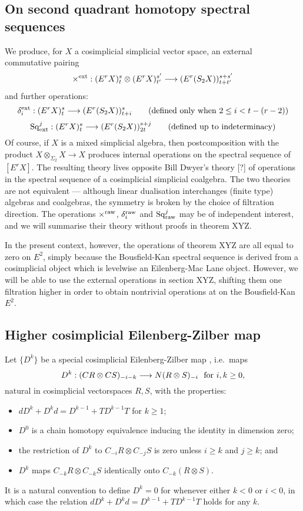\documentclass[11pt]{amsart}
\theoremstyle{plain}
\theoremstyle{definition}
\renewcommand{\to}{\longrightarrow}
\theoremstyle{plain}
\newcommand{\Sq}{\mathrm{Sq}}
\begin{document}
\begin{External spectral sequence operations}
\hfil

\subsection{On second quadrant homotopy spectral sequences}

We produce, for $X$ a cosimplicial simplicial vector space, an external commutative pairing
\[\times^\textup{ext}:(E^rX)^s_{t}\otimes (E^rX)_{t'}^{s'}\to (E^r(S_2X))^{s+s'}_{t+t'}\]
and further operations:
\[\delta_i^\textup{ext}:(E^rX)^s_{t}\to (E^r(S_2X))^{s}_{t+i}\textup{\qquad (defined only when $2\leq i<t-(r-2)$)}\]
\[\Sq^j_\textup{ext}:(E^rX)^s_{t}\to (E^r(S_2X))^{s+j}_{2t}\textup{\qquad (defined up to indeterminacy)}\]
Of course, if $X$ is a mixed simplicial algebra, then postcomposition with the product $X\otimes_{\Sigma_2}X\to X$ produces internal operations on the spectral sequence of $[E^rX]$. The resulting theory lives opposite Bill Dwyer's theory [?] of operations in the spectral sequence of a cosimplicial simplicial coalgebra. The two theories are not equivalent --- although linear dualisation interchanges (finite type) algebras and coalgebras, the symmetry is broken by the choice of filtration direction. The operations $\times^\textup{raw}$, $\delta_i^\textup{raw}$ and $\Sq^j_\textup{raw}$ may be of independent interest, and we will summarise their theory without proofs in theorem XYZ.

In the present context, however, the operations of theorem XYZ are all equal to zero on $E^2$, simply because the Bousfield-Kan spectral sequence is derived from a cosimplicial object which is levelwise an Eilenberg-Mac Lane object. However, we will be able to use the external operations in section XYZ, shifting them one filtration higher in order to obtain nontrivial operations at on the Bousfield-Kan $E^2$.

\subsection{Higher cosimplicial Eilenberg-Zilber map}
Let $\{D^k\}$ be a special cosimplicial Eilenberg-Zilber map \cite[5.2]{turner_opns_and_sseqs_I.pdf}, i.e.\  maps
\[D^k:(CR\otimes CS)_{-i-k}\to N(R\otimes S)_{-i}\textup{\ \ for $i,k\geq0$},\]
natural in cosimplicial vectorspaces $R,S$,
with the properties:
\begin{itemize}
\setlength{\parindent}{.25in}
\item $dD^k+D^kd=D^{k-1}+TD^{k-1}T$ for $k\geq1$;
\item $D^0$ is a chain homotopy equivalence inducing the identity in dimension zero;
\item the restriction of $D^k$ to $C_{-i}R\otimes C_{-j}S$ is zero unless $i\geq k$ and $j\geq k$; and
\item $D^k$ maps $C_{-k}R\otimes C_{-k}S$ identically onto $C_{-k}(R\otimes S)$.
\end{itemize}
It is a natural convention to define $D^k=0$ for whenever either $k<0$ or $i<0$, in which case the relation $dD^k+D^kd=D^{k-1}+TD^{k-1}T$ holds for any $k$.

\end{External spectral sequence operations}
\end{document}
